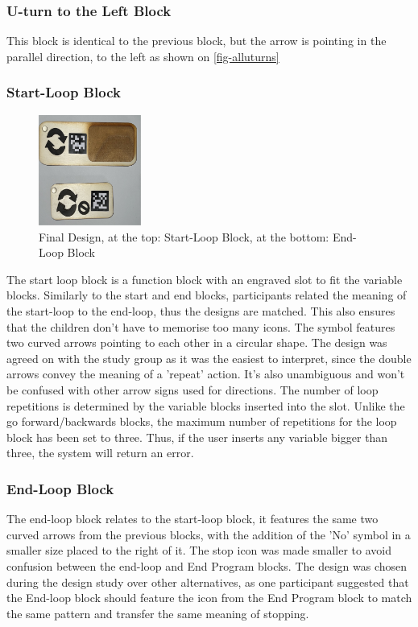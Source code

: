 \documentclass[oneside,%
                    author={Malak Hajji},
                    degree={BSc},
                    title={Designing An Accessible Computational Toolkit For Students},
                  subtitle={With Mixed Visual Abilities}]{dissertation}
\begin{document}
\subsubsection{U-turn to the Left Block}
This block is identical to the previous block, but the arrow is pointing in the parallel direction, to the left as shown on \ref{fig-alluturns}

\subsubsection{Start-Loop Block}
\FloatBarrier
\begin{figure}[h]
    \centering
    \includegraphics[width=0.3\textwidth]{thesis/startandendloop.eps}
    \caption{Final Design, at the top: Start-Loop Block, at the bottom: End-Loop Block}
    \label{fig-startandendloop}
\end{figure}
\FloatBarrier
The start loop block is a function block with an engraved slot to fit the variable blocks. Similarly to the start and end blocks, participants related the meaning of the start-loop to the end-loop, thus the designs are matched. This also ensures that the children don't have to memorise too many icons. The symbol features two curved arrows pointing to each other in a circular shape. The design was agreed on with the study group as it was the easiest to interpret, since the double arrows convey the meaning of a 'repeat' action. It's also unambiguous and won't be confused with other arrow signs used for directions. The number of loop repetitions is determined by the variable blocks inserted into the slot. Unlike the go forward/backwards blocks, the maximum number of repetitions for the loop block has been set to three. Thus, if the user inserts any variable bigger than three, the system will return an error.

\subsubsection{End-Loop Block}
The end-loop block relates to the start-loop block, it features the same two curved arrows from the previous blocks, with the addition of the 'No' symbol in a smaller size placed to the right of it. The stop icon was made smaller to avoid confusion between the end-loop and End Program blocks. The design was chosen during the design study over other alternatives, as one participant suggested that the End-loop block should feature the icon from the End Program block to match the same pattern and transfer the same meaning of stopping. 
\end{document}
